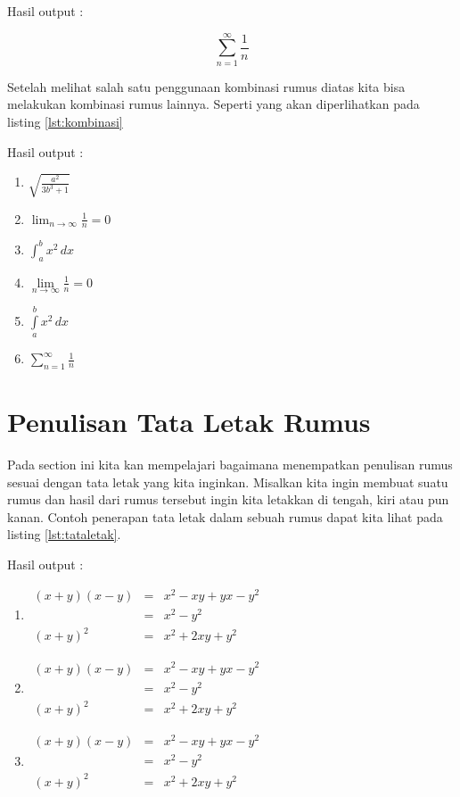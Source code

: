 Hasil output :

$$\sum^{\infty}_{n=1} \frac{1}{n}$$

Setelah melihat salah satu penggunaan kombinasi rumus diatas kita bisa melakukan kombinasi rumus lainnya. Seperti yang akan diperlihatkan pada listing \ref{lst:kombinasi}



Hasil output :
\begin{enumerate}
\item $\sqrt{ \frac{a^2}{3b^3+1}}$
\item $\lim_{n \to \infty} \frac{1}{n}=0$
\item $\int^b_a x^2 \, dx$
\item $\lim \limits_{n \to \infty} \frac{1}{n}=0$
\item $\int \limits^b_a x^2 \, dx$
\item $\sum \limits^{\infty}_{n=1} \frac{1}{n}$
\end{enumerate}

\section{Penulisan Tata Letak Rumus}
Pada section ini kita kan mempelajari bagaimana menempatkan penulisan rumus sesuai dengan tata letak yang kita inginkan. Misalkan kita ingin membuat suatu rumus dan hasil dari rumus tersebut ingin kita letakkan di tengah, kiri atau pun kanan. Contoh penerapan tata letak dalam sebuah rumus dapat kita lihat pada listing \ref{lst:tataletak}.


Hasil output :
\begin{enumerate}
\item $\begin{array}{ccc} (x+y)(x-y) & = & x^2-xy + yx-y^2 \\ & = & x^2-y^2 \\ (x+y)^2 & = & x^2 + 2xy + y^2 \end{array}$

\item $\begin{array}{lcr} (x+y)(x-y) & = & x^2-xy + yx-y^2 \\ & = & x^2-y^2 \\ (x+y)^2 & = & x^2 + 2xy + y^2 \end{array}$

\item $\begin{array}{rcl} (x+y)(x-y) & = & x^2-xy + yx-y^2 \\ & = & x^2-y^2 \\ (x+y)^2 & = & x^2 + 2xy + y^2 \end{array}$
\end{enumerate}






